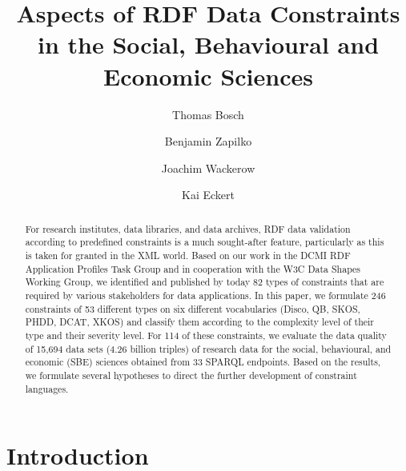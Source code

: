 \documentclass{llncs}
\begin{document}
\renewcommand{\arraystretch}{1.3}
\title{Aspects of RDF Data Constraints in the Social, Behavioural and Economic Sciences}
\subtitle{}

%
\author{Thomas Bosch \and Benjamin Zapilko \and Joachim Wackerow \and Kai Eckert}
%
\authorrunning{} %
%

\maketitle              %

\begin{abstract}

For research institutes, data libraries, and data archives,
RDF data validation according to predefined constraints is a much sought-after feature, 
particularly as this is taken for granted in the XML world.
Based on our work in the DCMI RDF Application Profiles Task Group and in cooperation with the W3C Data Shapes Working Group, we identified and published by today 82 types of constraints that are required by various stakeholders for data applications.
In this paper, we formulate 246 constraints of 53 different types on six different vocabularies (Disco, QB, SKOS, PHDD, DCAT, XKOS) and classify them according to the complexity level of their type and their severity level. For 114 of these constraints, we evaluate the data quality of 15,694 data sets (4.26 billion triples) of research data for the social, behavioural, and economic (SBE) sciences obtained from 33 SPARQL endpoints. 
Based on the results, we formulate several hypotheses to direct the further development of constraint languages.


\end{abstract}

\section{Introduction}
\end{document}
